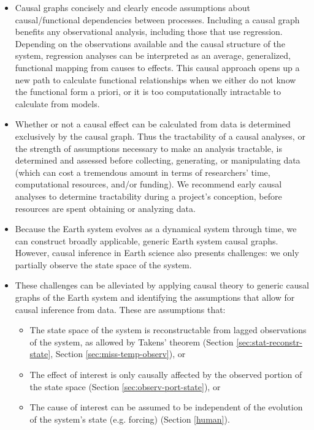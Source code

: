 \documentclass[12pt]{article}
\begin{document}
\begin{itemize}
\item Causal graphs concisely and clearly encode assumptions about
  causal/functional dependencies between processes. Including a causal
  graph benefits any observational analysis, including those that use
  regression. Depending on the observations available and the causal
  structure of the system, regression analyses can be interpreted as
  an average, generalized, functional mapping from causes to
  effects. This causal approach opens up a new path to calculate
  functional relationships when we either do not know the functional
  form a priori, or it is too computationally intractable to calculate
  from models.
\item Whether or not a causal effect can be calculated from data is
  determined exclusively by the causal graph. Thus the tractability of
  a causal analyses, or the strength of assumptions necessary to make
  an analysis tractable, is determined and assessed before collecting,
  generating, or manipulating data (which can cost a tremendous amount
  in terms of researchers' time, computational resources, and/or
  funding). We recommend early causal analyses to determine
  tractability during a project's conception, before resources are
  spent obtaining or analyzing data.
\item Because the Earth system evolves as a dynamical system through
  time, we can construct broadly applicable, generic Earth system
  causal graphs. However, causal inference in Earth science also
  presents challenges: we only partially observe the state space of
  the system.
\item These challenges can be alleviated by applying causal theory to
  generic causal graphs of the Earth system and identifying the
  assumptions that allow for causal inference from data. These are
  assumptions that:
  \begin{itemize}
  \item The state space of the system is reconstructable
    from lagged observations of the system, as allowed by
    Takens' theorem (Section \ref{sec:stat-reconstr-state}, Section \ref{sec:miss-temp-observ}), or
  \item The effect of interest is only causally
    affected by the observed portion of the state space (Section
    \ref{sec:observ-port-state}), or
  \item The cause of interest can be assumed to be independent of the
    evolution of the system's state (e.g. forcing) (Section
    \ref{human}).
  \end{itemize}
\end{itemize}
\end{document}
